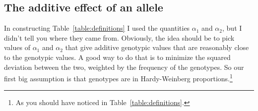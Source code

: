\documentclass[12pt]{article}
\begin{document}
\subsection*{The additive effect of an allele}

In constructing Table~\ref{table:definitions} I used the quantities
$\alpha_1$ and $\alpha_2$, but I didn't tell you where they came
from. Obviously, the idea should be to pick values of $\alpha_1$ and
$\alpha_2$ that give additive genotypic values that are reasonably
close to the genotypic values. A good way to do that is to minimize
the squared deviation between the two, weighted by the frequency of
the genotypes. So our first big assumption is that genotypes are in
Hardy-Weinberg proportions.\footnote{As you should have noticed in
  Table~\ref{table:definitions}.}
\end{document}

